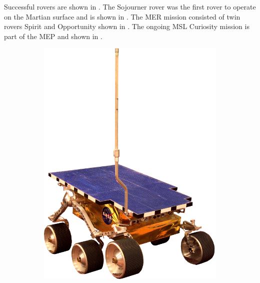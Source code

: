 Successful rovers are shown in . The Sojourner rover was the first rover to operate on the Martian surface and is shown in . The \ac{MER} mission consisted of twin rovers  Spirit and Opportunity shown in . The ongoing \ac{MSL} Curiosity mission is part of the \ac{MEP} and shown in .

\begin{figure}[h]
\captionsetup[subfigure]{justification=centering}
\vspace{-2ex}
	\centering
    \setlength{\subfigureWidth}{0.45\textwidth}
    \setlength{\graphicsHeight}{35mm}
    \hypersetup{hidelinks=true}%
	\begin{subfigure}[t]{\subfigureWidth}
        \centering
        \includegraphics[height=\graphicsHeight]{sections/state-of-the-art/past-and-ongoing-missions/images/rover-sojourner.png}

\end{subfigure}
\end{figure}
